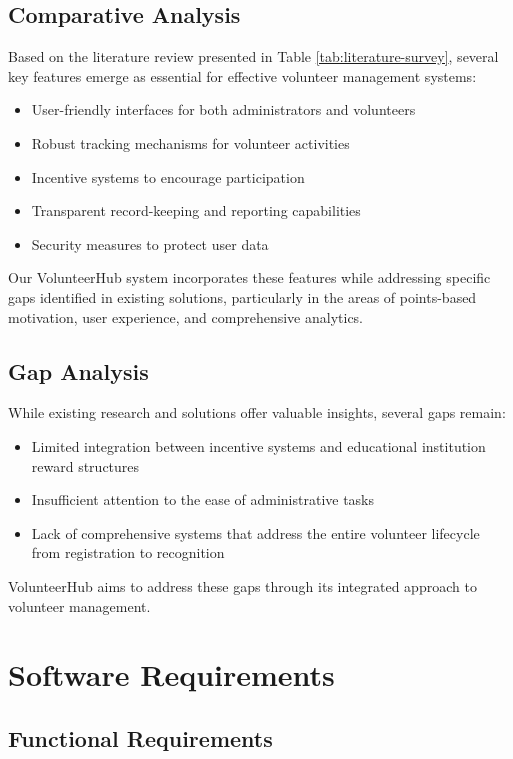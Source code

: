 \documentclass[12pt,a4paper]{report}
\begin{document}
\section{Comparative Analysis}
Based on the literature review presented in Table \ref{tab:literature-survey}, several key features emerge as essential for effective volunteer management systems:

\begin{itemize}
    \item User-friendly interfaces for both administrators and volunteers
    \item Robust tracking mechanisms for volunteer activities
    \item Incentive systems to encourage participation
    \item Transparent record-keeping and reporting capabilities
    \item Security measures to protect user data
\end{itemize}

Our VolunteerHub system incorporates these features while addressing specific gaps identified in existing solutions, particularly in the areas of points-based motivation, user experience, and comprehensive analytics.

\section{Gap Analysis}
While existing research and solutions offer valuable insights, several gaps remain:

\begin{itemize}
    \item Limited integration between incentive systems and educational institution reward structures
    \item Insufficient attention to the ease of administrative tasks
    \item Lack of comprehensive systems that address the entire volunteer lifecycle from registration to recognition
\end{itemize}

VolunteerHub aims to address these gaps through its integrated approach to volunteer management.

\chapter{Software Requirements}

\section{Functional Requirements}
\end{document}
